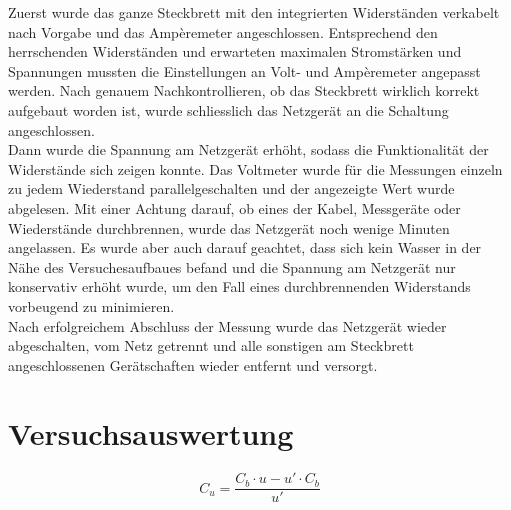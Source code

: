 \documentclass[a4paper,12pt]{article}
\begin{document}
Zuerst wurde das ganze Steckbrett mit den integrierten Widerständen verkabelt nach Vorgabe und das Ampèremeter angeschlossen. Entsprechend den herrschenden Widerständen und erwarteten maximalen Stromstärken und Spannungen mussten die Einstellungen an Volt- und Ampèremeter angepasst werden. Nach genauem Nachkontrollieren, ob das Steckbrett wirklich korrekt aufgebaut worden ist, wurde schliesslich das Netzgerät an die Schaltung angeschlossen. \\

Dann wurde die Spannung am Netzgerät erhöht, sodass die Funktionalität der Widerstände sich zeigen konnte. Das Voltmeter wurde für die Messungen einzeln zu jedem Wiederstand parallelgeschalten und der angezeigte Wert wurde abgelesen. Mit einer Achtung darauf, ob eines der Kabel, Messgeräte oder Wiederstände durchbrennen, wurde das Netzgerät noch wenige Minuten angelassen. Es wurde aber auch darauf geachtet, dass sich kein Wasser in der Nähe des Versuchesaufbaues befand und die Spannung am Netzgerät nur konservativ erhöht wurde, um den Fall eines durchbrennenden Widerstands vorbeugend zu minimieren.\\

Nach erfolgreichem Abschluss der Messung wurde das Netzgerät wieder abgeschalten, vom Netz getrennt und alle sonstigen am Steckbrett angeschlossenen Gerätschaften wieder entfernt und versorgt.


\newpage

\section{Versuchsauswertung}

$$C_u = \frac{C_b \cdot u - u' \cdot C_b}{u'}$$
\end{document}
